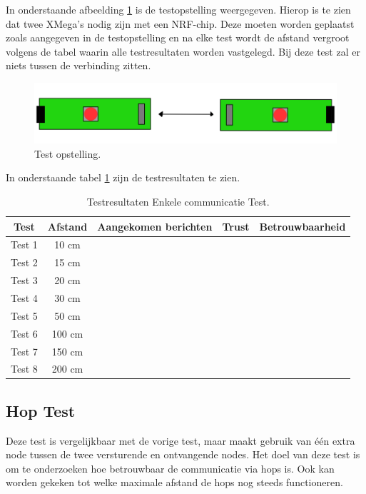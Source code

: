 In onderstaande afbeelding \ref{fig:TestCom} is de testopstelling weergegeven. Hierop is te zien dat twee XMega's nodig zijn met een NRF-chip. Deze moeten worden geplaatst zoals aangegeven in de testopstelling en na elke test wordt de afstand vergroot volgens de tabel waarin alle testresultaten worden vastgelegd. Bij deze test zal er niets tussen de verbinding zitten.
\begin{figure}[h]
    \centering
    \includegraphics[scale = 0.3]{img/test1.png}
    \caption{Test opstelling.}
    \label{fig:TestCom}
\end{figure}
In onderstaande tabel \ref{tab:EnkelCom} zijn de testresultaten te zien.
\begin{table}[h]
    \centering
    \begin{tabular}{|c||c|c|c|c|}
        \hline
        Test    & Afstand   & Aangekomen berichten  & Trust & Betrouwbaarheid   \\\hline\hline
        Test 1  & 10 cm     &                       &       &                   \\\hline
        Test 2  & 15 cm     &                       &       &                   \\\hline
        Test 3  & 20 cm     &                       &       &                   \\\hline
        Test 4  & 30 cm     &                       &       &                   \\\hline
        Test 5  & 50 cm     &                       &       &                   \\\hline
        Test 6  & 100 cm    &                       &       &                   \\\hline
        Test 7  & 150 cm    &                       &       &                   \\\hline
        Test 8  & 200 cm    &                       &       &                   \\\hline   
    \end{tabular}
    \caption{Testresultaten Enkele communicatie Test.}
    \label{tab:EnkelCom}
\end{table}

\subsection{Hop Test}
Deze test is vergelijkbaar met de vorige test, maar maakt gebruik van één extra node tussen de twee versturende en ontvangende nodes. Het doel van deze test is om te onderzoeken hoe betrouwbaar de communicatie via hops is. Ook kan worden gekeken tot welke maximale afstand de hops nog steeds functioneren.

